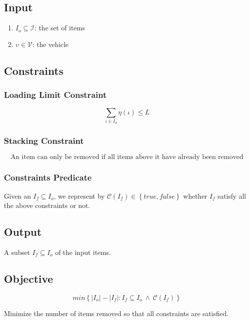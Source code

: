 \documentclass{article}
\newcommand{\true}{\ensuremath{true}\xspace}
\newcommand{\false}{\ensuremath{false}\xspace}
\newcommand{\abs}[1]{\ensuremath{\left| #1 \right|}\xspace}
\newcommand{\Set}[1]{\ensuremath{\left\{#1\right\}}}
\newcommand{\SetOf}[2]{\ensuremath{\left\{ #1 : #2 \right\}}\xspace}
\newcommand{\vehicleO}{\ensuremath{\upsilon}\xspace}
\newcommand{\vehicleSet}{\mathcal{V}\xspace}
\newcommand{\loadingFunction}{\ensuremath{\eta}\xspace}
\newcommand{\loadingFunctionApply}[1]{\loadingFunction \left( #1 \right)\xspace}
\newcommand{\loadingLimit}{\ensuremath{L}\xspace}
\newcommand{\itemO}{\ensuremath{\iota}\xspace}
\newcommand{\itemSet}{\ensuremath{\mathcal{I}}\xspace}
\newcommand{\itemInput}{\ensuremath{\mathit{I}_{o}}\xspace}
\newcommand{\itemOutput}{\ensuremath{\mathit{I}_{f}}\xspace}
\newcommand{\vehicleInput}{\vehicleO}
\newcommand{\constraintsPredicateSymbol}{\ensuremath{\mathscr{C}}\xspace}
\newcommand{\constraintsPredicate}[1]{\ensuremath{\constraintsPredicateSymbol \left( #1 \right)}\xspace}
\begin{document}
\subsection{Input}

\begin{enumerate}
	\item $\itemInput \subseteq \itemSet$: the set of items
	\item $\vehicleInput \in \vehicleSet$: the vehicle
\end{enumerate}

\subsection{Constraints}

\subsubsection*{Loading Limit Constraint}
\begin{equation}
	\label{constraint:loading-limit}
	\displaystyle\sum\limits_{\itemO \in \itemInput}
		\loadingFunctionApply{\itemO}
		\leq \loadingLimit
\end{equation}

\subsubsection*{Stacking Constraint}
\begin{equation}
	\label{constraint:stacking}
	\mbox{An item can only be removed if all items above it have already been removed}
\end{equation}

\subsubsection*{Constraints Predicate}

Given an $\itemOutput \subseteq \itemInput$, we represent by $\constraintsPredicate{\itemOutput} \in \Set{\true, \false}$ whether \itemOutput satisfy all the above constraints or not.

\subsection{Output}

A subset $\itemOutput \subseteq \itemInput$ of the input items.

\subsection{Objective}

\begin{equation}
	min\SetOf{\abs{\itemInput} - \abs{\itemOutput}}{\itemOutput \subseteq \itemInput \ \land \ \constraintsPredicate{\itemOutput}}
\end{equation}

Minimize the number of items removed so that all constraints are satisfied.



\end{document}
